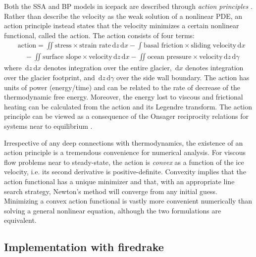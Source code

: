 \documentclass{article}
\theoremstyle{definition}
\theoremstyle{plain}
\newcommand{\ud}{\hspace{2pt}\mathrm{d}}
\begin{document}
Both the SSA and BP models in icepack are described through \emph{action principles} \citep{dukowicz2010consistent}.
Rather than describe the velocity as the weak solution of a nonlinear PDE, an action principle instead states that the velocity minimizes a certain nonlinear functional, called the action.
The action consists of four terms:
\begin{align}
    & \text{action} = \iint\text{stress} \times \text{strain rate}\ud z\ud x - \int\text{basal friction} \times \text{sliding velocity}\ud x \nonumber \\
    & \quad - \iint\text{surface slope}\times\text{velocity}\ud z\ud x - \iint\text{ocean pressure}\times\text{velocity}\ud z\ud \gamma
    \label{action-functional}
\end{align}
where $\ud z\ud x$ denotes integration over the entire glacier, $\ud x$ denotes integration over the glacier footprint, and $\ud z\ud\gamma$ over the side wall boundary.
The action has units of power (energy/time) and can be related to the rate of decrease of the thermodynamic free energy.
Moreover, the energy lost to viscous and frictional heating can be calculated from the action and its Legendre transform.
The action principle can be viewed as a consequence of the Onsager reciprocity relations for systems near to equilibrium \citep{de2013non}.

Irrespective of any deep connections with thermodynamics, the existence of an action principle is a tremendous convenience for numerical analysis.
For viscous flow problems near to steady-state, the action is \emph{convex} as a function of the ice velocity, i.e. its second derivative is positive-definite.
Convexity implies that the action functional has a unique minimizer and that, with an appropriate line search strategy, Newton's method will converge from any initial guess.
Minimizing a convex action functional is vastly more convenient numerically than solving a general nonlinear equation, although the two formulations are equivalent.


\subsection{Implementation with firedrake}
\end{document}
